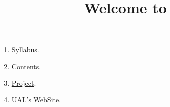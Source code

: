 
%
\title{Welcome to \SM{}}

\maketitle

\begin{enumerate}
\item \href{https://sistemas-multimedia.github.io/syllabus}{Syllabus}.  %
\item \href{https://sistemas-multimedia.github.io/contents}{Contents}.  %
\item \href{https://github.com/Sistemas-Multimedia/VCF}{Project}.  %
\item \href{https://www.ual.es/estudios/masteres/presentacion/plandeestudios/asignatura/7114/71142105}{UAL's WebSite}.  %
\end{enumerate}
